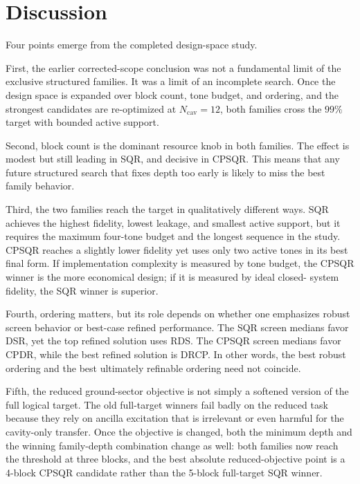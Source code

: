 ﻿\documentclass[aps,pra,twocolumn,reprint,amsmath,amssymb,floatfix]{revtex4-2}
\begin{document}
\section{Discussion}

Four points emerge from the completed design-space study.

First, the earlier corrected-scope conclusion was not a fundamental limit of
the exclusive structured families. It was a limit of an incomplete search.
Once the design space is expanded over block count, tone budget, and ordering,
and the strongest candidates are re-optimized at $N_{\mathrm{cav}}=12$, both
families cross the $99\%$ target with bounded active support.

Second, block count is the dominant resource knob in both families. The effect
is modest but still leading in SQR, and decisive in CPSQR. This means that any
future structured search that fixes depth too early is likely to miss the best
family behavior.

Third, the two families reach the target in qualitatively different ways. SQR
achieves the highest fidelity, lowest leakage, and smallest active support, but
it requires the maximum four-tone budget and the longest sequence in the study.
CPSQR reaches a slightly lower fidelity yet uses only two active tones in its
best final form. If implementation complexity is measured by tone budget, the
CPSQR winner is the more economical design; if it is measured by ideal closed-
system fidelity, the SQR winner is superior.

Fourth, ordering matters, but its role depends on whether one emphasizes robust
screen behavior or best-case refined performance. The SQR screen medians favor
DSR, yet the top refined solution uses RDS. The CPSQR screen medians favor
CPDR, while the best refined solution is DRCP. In other words, the best robust
ordering and the best ultimately refinable ordering need not coincide.

Fifth, the reduced ground-sector objective is not simply a softened version of
the full logical target. The old full-target winners fail badly on the reduced
task because they rely on ancilla excitation that is irrelevant or even harmful
for the cavity-only transfer. Once the objective is changed, both the minimum
depth and the winning family-depth combination change as well: both families now
reach the threshold at three blocks, and the best absolute reduced-objective
point is a 4-block CPSQR candidate rather than the 5-block full-target SQR
winner.
\end{document}
